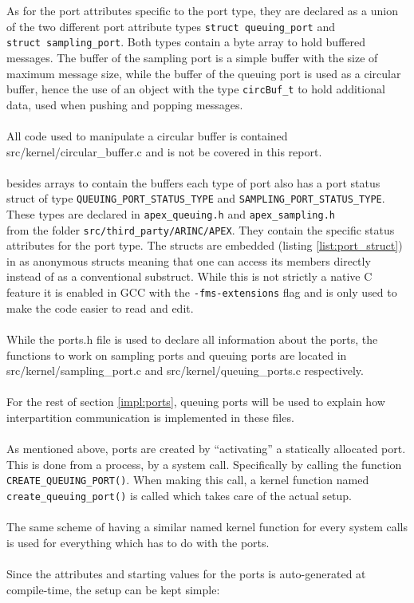 As for the port attributes specific to the port type,
they are declared as a union of the two different port attribute types
\texttt{struct queuing\_port} and\\
\texttt{struct sampling\_port}.
Both types contain a byte array to hold buffered messages.
The buffer of the sampling port is a simple buffer with the size of maximum message size,
while the buffer of the queuing port is used as a circular buffer,
hence the use of an object with the type \texttt{circBuf\_t} to hold additional data,
used when pushing and popping messages.
\\\\
All code used to manipulate a circular buffer is contained src/kernel/circular\_buffer.c
and is not be covered in this report.
\\\\
besides arrays to contain the buffers each type of port also has a port status struct
of type \texttt{QUEUING\_PORT\_STATUS\_TYPE} and \texttt{SAMPLING\_PORT\_STATUS\_TYPE}.
These types are declared in \texttt{apex\_queuing.h} and \texttt{apex\_sampling.h}\\
from the folder \texttt{src/third\_party/ARINC/APEX}.
They contain the specific status attributes for the port type.
The structs are embedded (listing \ref{list:port_struct}) in as anonymous structs
meaning that one can access its members directly instead of as a conventional substruct.
While this is not strictly a native C feature it is enabled in GCC with the \texttt{-fms-extensions} flag
and is only used to make the code easier to read and edit.
\\\\
While the ports.h file is used to declare all information about the ports,
the functions to work on sampling ports and queuing ports are located in
src/kernel/sampling\_port.c and src/kernel/queuing\_ports.c respectively.
\\\\
For the rest of section \ref{impl:ports}, queuing ports will be used to explain
how interpartition communication is implemented in these files.
\\\\
As mentioned above,
ports are created by ``activating'' a statically allocated port.
This is done from a process, by a system call.
Specifically by calling the function \texttt{CREATE\_QUEUING\_PORT()}.
When making this call, a kernel function named \texttt{create\_queuing\_port()}
is called which takes care of the actual setup.
\\\\
The same scheme of having a similar named kernel function for every system calls
is used for everything which has to do with the ports.
\\\\
Since the attributes and starting values for the ports is auto-generated at compile-time,
the setup can be kept simple:

